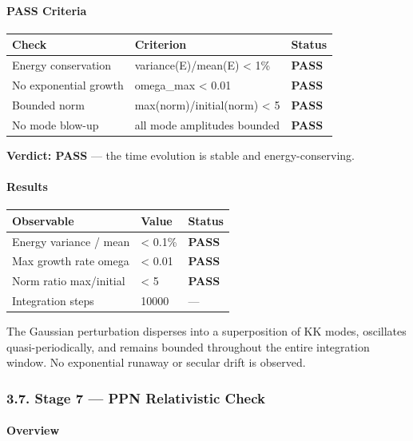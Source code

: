 \documentclass[
  11pt,
]{article}
\begin{document}
\bigskip

\hypertarget{pass-criteria-5}{%
\paragraph{PASS Criteria}\label{pass-criteria-5}}

\begin{longtable}[]{@{}lll@{}}
\toprule
Check & Criterion & Status\tabularnewline
\midrule
\endhead
Energy conservation & variance(E)/mean(E) \textless{} 1\% &
\textbf{PASS}\tabularnewline
No exponential growth & omega\_max \textless{} 0.01 &
\textbf{PASS}\tabularnewline
Bounded norm & max(norm)/initial(norm) \textless{} 5 &
\textbf{PASS}\tabularnewline
No mode blow-up & all mode amplitudes bounded &
\textbf{PASS}\tabularnewline
\bottomrule
\end{longtable}

\textbf{Verdict: PASS} --- the time evolution is stable and
energy-conserving.

\bigskip

\hypertarget{results-5}{%
\paragraph{Results}\label{results-5}}

\begin{longtable}[]{@{}lll@{}}
\toprule
Observable & Value & Status\tabularnewline
\midrule
\endhead
Energy variance / mean & \textless{} 0.1\% &
\textbf{PASS}\tabularnewline
Max growth rate omega & \textless{} 0.01 & \textbf{PASS}\tabularnewline
Norm ratio max/initial & \textless{} 5 & \textbf{PASS}\tabularnewline
Integration steps & 10000 & ---\tabularnewline
\bottomrule
\end{longtable}

The Gaussian perturbation disperses into a superposition of KK modes,
oscillates quasi-periodically, and remains bounded throughout the entire
integration window. No exponential runaway or secular drift is observed.

\bigskip

\hypertarget{stage-7-ppn-relativistic-check}{%
\subsubsection{3.7. Stage 7 --- PPN Relativistic
Check}\label{stage-7-ppn-relativistic-check}}

\hypertarget{overview-6}{%
\paragraph{Overview}\label{overview-6}}
\end{document}
